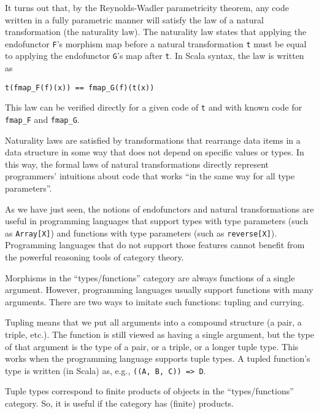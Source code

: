 It turns out that, by the Reynolds-Wadler parametricity theorem, any
code written in a fully parametric manner will satisfy the law of
a natural transformation (the naturality law). The naturality law
states that applying the endofunctor \lstinline!F!\textsf{'}s morphism map
before a natural transformation \lstinline!t! must be equal to applying
the endofunctor \lstinline!G!\textsf{'}s map after \lstinline!t!. In Scala
syntax, the law is written as
\begin{lstlisting}
t(fmap_F(f)(x)) == fmap_G(f)(t(x))
\end{lstlisting}
This law can be verified directly for a given code of \lstinline!t!
and with known code for \lstinline!fmap_F! and \lstinline!fmap_G!.

Naturality laws are satisfied by transformations that rearrange data
items in a data structure in some way that does not depend on specific
values or types. In this way, the formal laws of natural transformations
directly represent programmers\textsf{'} intuitions about code that works \textsf{``}in
the same way for all type parameters\textsf{''}.

As we have just seen, the notions of endofunctors and natural transformations
are useful in programming languages that support types with type parameters
(such as \lstinline!Array[X]!) and functions with type parameters
(such as \lstinline!reverse[X]!). Programming languages that do not
support those features cannot benefit from the powerful reasoning
tools of category theory.


Morphisms in the \textsf{``}types/functions\textsf{''} category are always functions
of a single argument. However, programming languages usually support
functions with many arguments. There are two ways to imitate such
functions: tupling and currying.

Tupling means that we put all arguments into a compound structure
(a pair, a triple, etc.). The function is still viewed as having a
single argument, but the type of that argument is the type of a pair,
or a triple, or a longer tuple type. This works when the programming
language supports tuple types. A tupled function\textsf{'}s type is written
(in Scala) as, e.g., \lstinline!((A, B, C)) => D!.

Tuple types correspond to finite products of objects in the \textsf{``}types/functions\textsf{''}
category. So, it is useful if the category has (finite) products. 

